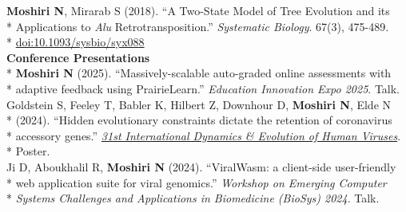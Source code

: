 \documentclass[margin,line]{res}
\begin{document}
\begin{resume}
\hspace*{4mm} \textbf{Moshiri N}, Mirarab S (2018). ``A Two-State Model of Tree Evolution and its\\*
\hspace*{9.5mm} Applications to \textit{Alu} Retrotransposition.'' \textit{Systematic Biology}. 67(3), 475-489.\\*\vspace{2mm}
\hspace*{8mm} \href{https://doi.org/10.1093/sysbio/syx088}{doi:10.1093/sysbio/syx088}
~\\
\textbf{Conference Presentations}\vspace{2mm}\\*
\hspace*{4mm} \textbf{Moshiri N} (2025). ``Massively-scalable auto-graded online assessments with\\*\vspace{2mm}
\hspace*{9.5mm} adaptive feedback using PrairieLearn.'' \textit{Education Innovation Expo 2025}. Talk.\\
\hspace*{4mm} Goldstein S, Feeley T, Babler K, Hilbert Z, Downhour D, \textbf{Moshiri N}, Elde N\\*
\hspace*{9.5mm} (2024). ``Hidden evolutionary constraints dictate the retention of coronavirus\\*
\hspace*{9.5mm} accessory genes.'' \href{https://cpd.ucsd.edu/hivdynamics/}{\textit{31st International Dynamics \& Evolution of Human Viruses}}.\\*\vspace{2mm}
\hspace*{8mm} Poster.\\
\hspace*{4mm} Ji D, Aboukhalil R, \textbf{Moshiri N} (2024). ``ViralWasm: a client-side user-friendly\\*
\hspace*{9.5mm} web application suite for viral genomics.'' \textit{Workshop on Emerging Computer}\\*\vspace{2mm}
\hspace*{8mm} \textit{Systems Challenges and Applications in Biomedicine (BioSys) 2024}. Talk.\\

\end{resume}
\end{document}
